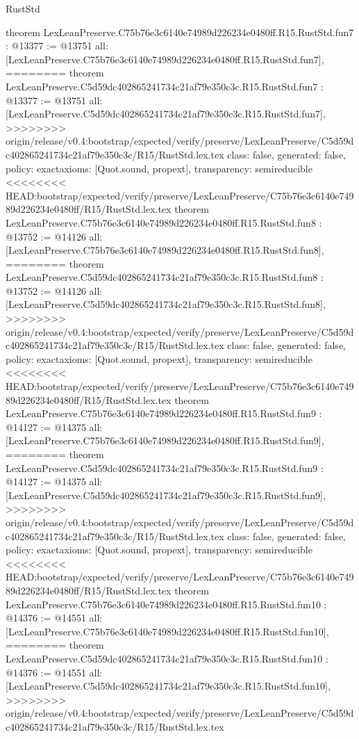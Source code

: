 \begin{lexlean}{RustStd}
\begin{coremodule}
{\begin{coremodule}
{{{{{{{{{theorem LexLeanPreserve.C75b76e3c6140e74989d226234e0480ff.R15.RustStd.fun7 : @13377 := @13751 {
  all: [LexLeanPreserve.C75b76e3c6140e74989d226234e0480ff.R15.RustStd.fun7],
========
theorem LexLeanPreserve.C5d59dc402865241734c21af79e350c3c.R15.RustStd.fun7 : @13377 := @13751 {
  all: [LexLeanPreserve.C5d59dc402865241734c21af79e350c3c.R15.RustStd.fun7],
>>>>>>>> origin/release/v0.4:bootstrap/expected/verify/preserve/LexLeanPreserve/C5d59dc402865241734c21af79e350c3c/R15/RustStd.lex.tex
  class: false,
  generated: false,
  policy: exact{axioms: [Quot.sound, propext]},
  transparency: semireducible
}
<<<<<<<< HEAD:bootstrap/expected/verify/preserve/LexLeanPreserve/C75b76e3c6140e74989d226234e0480ff/R15/RustStd.lex.tex
theorem LexLeanPreserve.C75b76e3c6140e74989d226234e0480ff.R15.RustStd.fun8 : @13752 := @14126 {
  all: [LexLeanPreserve.C75b76e3c6140e74989d226234e0480ff.R15.RustStd.fun8],
========
theorem LexLeanPreserve.C5d59dc402865241734c21af79e350c3c.R15.RustStd.fun8 : @13752 := @14126 {
  all: [LexLeanPreserve.C5d59dc402865241734c21af79e350c3c.R15.RustStd.fun8],
>>>>>>>> origin/release/v0.4:bootstrap/expected/verify/preserve/LexLeanPreserve/C5d59dc402865241734c21af79e350c3c/R15/RustStd.lex.tex
  class: false,
  generated: false,
  policy: exact{axioms: [Quot.sound, propext]},
  transparency: semireducible
}
<<<<<<<< HEAD:bootstrap/expected/verify/preserve/LexLeanPreserve/C75b76e3c6140e74989d226234e0480ff/R15/RustStd.lex.tex
theorem LexLeanPreserve.C75b76e3c6140e74989d226234e0480ff.R15.RustStd.fun9 : @14127 := @14375 {
  all: [LexLeanPreserve.C75b76e3c6140e74989d226234e0480ff.R15.RustStd.fun9],
========
theorem LexLeanPreserve.C5d59dc402865241734c21af79e350c3c.R15.RustStd.fun9 : @14127 := @14375 {
  all: [LexLeanPreserve.C5d59dc402865241734c21af79e350c3c.R15.RustStd.fun9],
>>>>>>>> origin/release/v0.4:bootstrap/expected/verify/preserve/LexLeanPreserve/C5d59dc402865241734c21af79e350c3c/R15/RustStd.lex.tex
  class: false,
  generated: false,
  policy: exact{axioms: [Quot.sound, propext]},
  transparency: semireducible
}
<<<<<<<< HEAD:bootstrap/expected/verify/preserve/LexLeanPreserve/C75b76e3c6140e74989d226234e0480ff/R15/RustStd.lex.tex
theorem LexLeanPreserve.C75b76e3c6140e74989d226234e0480ff.R15.RustStd.fun10 : @14376 := @14551 {
  all: [LexLeanPreserve.C75b76e3c6140e74989d226234e0480ff.R15.RustStd.fun10],
========
theorem LexLeanPreserve.C5d59dc402865241734c21af79e350c3c.R15.RustStd.fun10 : @14376 := @14551 {
  all: [LexLeanPreserve.C5d59dc402865241734c21af79e350c3c.R15.RustStd.fun10],
>>>>>>>> origin/release/v0.4:bootstrap/expected/verify/preserve/LexLeanPreserve/C5d59dc402865241734c21af79e350c3c/R15/RustStd.lex.tex
}}}}}}}}}}}}}}
\end{coremodule}}
\end{coremodule}
\end{lexlean}
